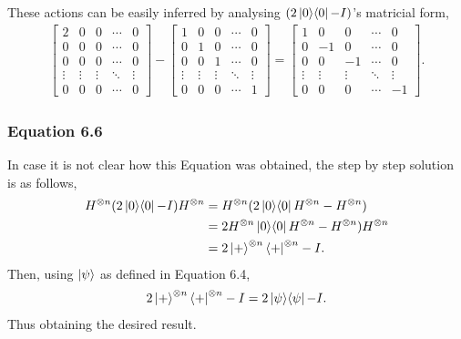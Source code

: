 These actions can be easily inferred by analysing $(2 \mathop{\mathinner{ |{0}\rangle \langle{0}|}} - I)$'s matricial form,
\begin{align}
    \left[ \begin{matrix}
        2 & 0 & 0 & \cdots & 0 \\
        0 & 0 & 0 & \cdots & 0 \\
        0 & 0 & 0 & \cdots & 0 \\
        \vdots & \vdots & \vdots & \ddots & \vdots \\
        0 & 0 & 0 & \cdots & 0
    \end{matrix} \right]
    -
    \left[ \begin{matrix}
        1 & 0 & 0 & \cdots & 0 \\
        0 & 1 & 0 & \cdots & 0 \\
        0 & 0 & 1 & \cdots & 0 \\
        \vdots & \vdots & \vdots & \ddots & \vdots \\
        0 & 0 & 0 & \cdots & 1
    \end{matrix} \right]
    =
    \left[ \begin{matrix}
        1 & 0 & 0 & \cdots & 0 \\
        0 & -1 & 0 & \cdots & 0 \\
        0 & 0 & -1 & \cdots & 0 \\
        \vdots & \vdots & \vdots & \ddots & \vdots \\
        0 & 0 & 0 & \cdots & -1
    \end{matrix} \right].
\end{align}

\subsubsection{Equation 6.6}
In case it is not clear how this Equation was obtained,
the step by step solution is as follows,
\begin{align}
    H^{\otimes n} (2 \mathop{\mathinner{ |{0}\rangle \langle{0}|}} - I) H^{\otimes n} &=
        H^{\otimes n} (2 \mathop{\mathinner{ |{0}\rangle \langle{0}|}} H^{\otimes n} - H^{\otimes n}) \\
    &= 2 H^{\otimes n} \mathop{\mathinner{ |{0}\rangle \langle{0}|}} H^{\otimes n} - H^{\otimes n}) H^{\otimes n} \\
    &= 2 \ket{+}^{\otimes n} \bra{+}^{\otimes n} - I.
\end{align}
Then, using $\ket\psi$ as defined in Equation 6.4,
\begin{align}
    2 \ket{+}^{\otimes n} \bra{+}^{\otimes n} - I = 2 \mathop{\mathinner{ |{\psi}\rangle \langle{\psi}|}} - I.
\end{align}
Thus obtaining the desired result.

